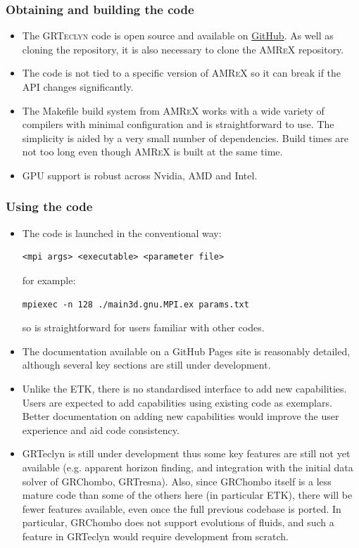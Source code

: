 \documentclass[12pt,a4paper]{article}
\numberwithin{figure}{subsection}
\newcommand{\grteclyn}{\textsc{GRTeclyn}\xspace}
\newcommand{\amrex}{\textsc{AMReX}\xspace}
\begin{document}
\subsubsection{Obtaining and building the code}
\begin{itemize}
    \item The \grteclyn code is open source and available on
    \href{https://github.com/GRTLCollaboration/GRTeclyn}{GitHub}. As well as
    cloning the repository, it is also necessary to clone the \amrex repository.
    \item The code is not tied to a specific version of \amrex so it can break
    if the API changes significantly.
    \item The Makefile build system from \amrex works with a wide variety of
    compilers with minimal configuration and is straightforward to use. The
    simplicity is aided by a very small number of dependencies. Build
    times are not too long even though \amrex is built at the same time.
    \item GPU support is robust across Nvidia, AMD and Intel.
\end{itemize}

\subsubsection{Using the code}
\begin{itemize}
    \item The code is launched in the conventional way:
    \begin{lstlisting}[style=shortcode]
        <mpi args> <executable> <parameter file>
    \end{lstlisting}
    for example:
    \begin{lstlisting}[style=shortcode]
        mpiexec -n 128 ./main3d.gnu.MPI.ex params.txt
    \end{lstlisting}
    so is straightforward for users familiar with other codes.
    \item The documentation available on a GitHub Pages site is reasonably
    detailed, although several key sections are still under development.
    \item Unlike the ETK, there is no standardised interface to add new
    capabilities. Users are expected to add capabilities using existing code as exemplars. Better documentation on adding new capabilities would improve the user experience and aid code consistency.
    \item GRTeclyn is still under development thus some key features are still not yet available (e.g.
    apparent horizon finding, and integration with the initial data solver of GRChombo, GRTresna). Also, since GRChombo itself is a less mature code than some of the others here (in particular ETK), there will be fewer features available, even once the full previous codebase is ported. In particular, GRChombo does not support evolutions of fluids, and such a feature in GRTeclyn would require development from scratch.
\end{itemize}
\end{document}
